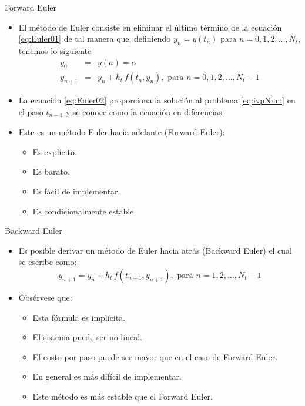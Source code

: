 \documentclass{beamer}
\begin{document}
\begin{frame}{Forward Euler}

\begin{itemize}
	\item El método de Euler consiste en eliminar el último término de la ecuación \eqref{eq:Euler01} de tal manera que, definiendo $y_n = y(t_n)$ para $n = 0,1,2, \dots , N_t$, tenemos lo siguiente
	\begin{eqnarray}
	y_0 & = & y(a) = \alpha \nonumber \\
	y_{n+1} & = & y_n + h_t \, f(t_n, y_n), \text{ para } n = 0,1,2, \dots, N_t - 1 \label{eq:Euler02}
	\end{eqnarray} 
	\item La ecuación \eqref{eq:Euler02} proporciona la solución al problema \eqref{eq:ivpNum} en el paso $t_{n+1}$ y se conoce como la ecuación en diferencias.
	\item Este es un método Euler hacia adelante (Forward Euler):
	\begin{itemize}
		\item Es explícito.
		\item Es barato.
		\item Es fácil de implementar.
		\item Es condicionalmente estable
	\end{itemize} 
\end{itemize}

\end{frame}

\begin{frame}{Backward Euler}

\begin{itemize}
	\item Es posible derivar un método de Euler hacia atrás (Backward Euler) el cual se escribe como:
	\begin{displaymath}
	y_{n+1} = y_n + h_t \, f(t_{n+1}, y_{n+1}), \text{ para } n = 1,2, \dots , N_t-1
	\end{displaymath}
	\item Obsérvese que:
	\begin{itemize}
		\item Esta fórmula es implícita.
		\item El sistema puede ser no lineal.
		\item El costo por paso puede ser mayor que en el caso de Forward Euler.
		\item En general es más difícil de implementar.
		\item Este método es más estable que el Forward Euler.
	\end{itemize}
\end{itemize}

\end{frame}
\end{document}
